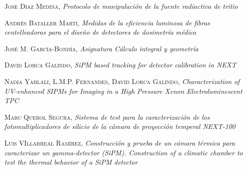 \begin{thebibliography}{99}
 \textsc{Jose Díaz Medina},
\textit{Protocolo de manipulación de la fuente radiactiva de tritio}

 \textsc{Andrés Bataller Martí},
\textit{Medidas de la eficiencia luminosa de fibras centelleadoras para el diseño de detectores de dosimetría médica}

 \textsc{José M. García-Bondía},
\textit{Asignatura Cálculo integral y geometría}

 \textsc{David Lorca Galindo},
\textit{SiPM based tracking for detector calibration in NEXT}

 \textsc{Nadia Yahlali}, \textsc{L.M.P. Fernandes}, \textsc{David Lorca Galindo},
\textit{Characterization of UV-enhanced SIPMs for Imaging in a High Pressure Xenon Electroluminescent TPC}

 \textsc{Marc Querol Segura},
\textit{Sistema de test para la caracterización de los fotomultiplicadores de silicio de la cámara de proyección temperal NEXT-100}

 \textsc{Luis VIllarreal Ramírez},
\textit{Construcción y prueba de un cámara térmica para caracterizar un gamma-detector (SiPM). Construction of a climatic chamber to test the thermal behavior of a SiPM detector}
 
\end{thebibliography}